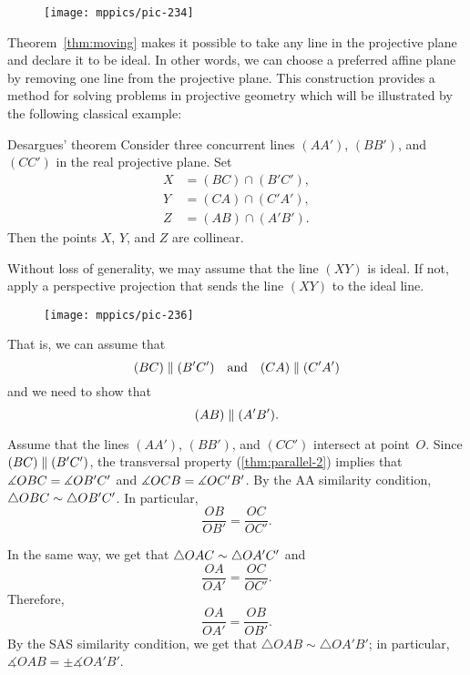 {

\begin{wrapfigure}{r}{37mm}
\vskip0mm
\centering
\texttt{[image: mppics/pic-234]}
\end{wrapfigure}

Theorem~\ref{thm:moving} makes it possible to take any line in the projective plane and declare it to be ideal.
In other words, we can choose a preferred affine plane by removing one line from the projective plane.
This construction provides a method for solving problems in projective geometry 
which will be illustrated by the following classical example:


\begin{thm}{Desargues' theorem}\label{thm:desargues}
Consider three concurrent lines $(AA')$, $(BB')$, and $(CC')$ in the real projective plane.
Set
\begin{align*}
X&=(BC)\cap (B'C'),\\
Y&=(CA)\cap (C'A'),\\
Z&=(AB)\cap (A'B').
\end{align*}
Then the points $X$, $Y$, and $Z$ are collinear.
\end{thm}

}

Without loss of generality, we may assume that the line $(XY)$ is ideal.
If not, apply a perspective projection that sends the line $(XY)$ to the ideal line.

\begin{wrapfigure}{o}{40mm}
\vskip-8mm
\centering
\texttt{[image: mppics/pic-236]}
\end{wrapfigure}

That is, we can assume that 
\[(BC)\z\parallel (B'C')\quad\text{and}\quad(CA)\z\parallel (C'A')\]
and we need to show that 
\[(AB)\z\parallel(A'B').\]

Assume that the lines $(AA')$, $(BB')$, and $(CC')$ intersect at point~$O$.
Since $(BC)\z\parallel (B'C')$, 
the transversal property (\ref{thm:parallel-2}) implies that $\measuredangle OBC\z= \measuredangle OB'C'$ and $\measuredangle OCB\z= \measuredangle OC'B'$.
By the AA similarity condition, $\triangle OBC\z\sim\triangle OB'C'$.
In particular,
\[\frac{OB}{OB'}=\frac{OC}{OC'}.\]

In the same way, we get that $\triangle OAC\z\sim\triangle OA'C'$ and
\[\frac{OA}{OA'}=\frac{OC}{OC'}.\]
Therefore, 
\[\frac{OA}{OA'}=\frac{OB}{OB'}.\]
By the SAS similarity condition, 
we get that $\triangle OAB\sim\triangle OA'B'$;
in particular, $\measuredangle OAB=\pm\measuredangle OA'B'$.

